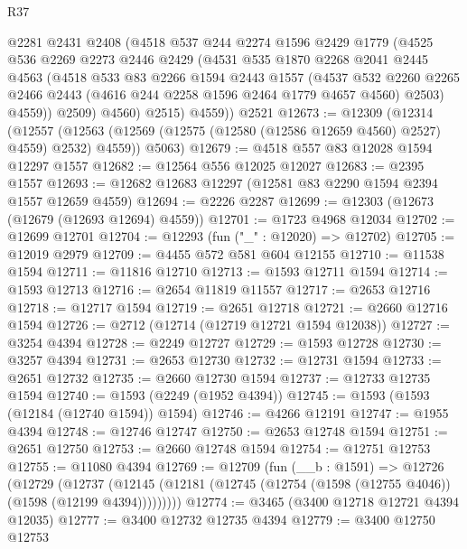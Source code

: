 \begin{lexlean}{R37}
\begin{coremodule}
          @2281
          @2431
          @2408
          (@4518
            @537
            @244
            @2274
            @1596
            @2429
            @1779
            (@4525
              @536
              @2269
              @2273
              @2446
              @2429
              (@4531
                @535
                @1870
                @2268
                @2041
                @2445
                @4563
                (@4518
                  @533
                  @83
                  @2266
                  @1594
                  @2443
                  @1557
                  (@4537
                    @532
                    @2260
                    @2265
                    @2466
                    @2443
                    (@4616 @244 @2258 @1596 @2464 @1779 @4657 @4560)
                    @2503)
                  @4559))
              @2509)
            @4560)
          @2515)
        @4559))
    @2521
@12673 := @12309
    (@12314
      (@12557 (@12563 (@12569 (@12575 (@12580 (@12586 @12659 @4560) @2527) @4559) @2532) @4559))
      @5063)
@12679 := @4518 @557 @83 @12028 @1594 @12297 @1557
@12682 := @12564 @556 @12025 @12027
@12683 := @2395 @1557
@12693 := @12682 @12683 @12297 (@12581 @83 @2290 @1594 @2394 @1557 @12659 @4559)
@12694 := @2226 @2287
@12699 := @12303 (@12673 (@12679 (@12693 @12694) @4559))
@12701 := @1723 @4968 @12034
@12702 := @12699 @12701
@12704 := @12293 (fun ("_" : @12020) => @12702)
@12705 := @12019 @2979
@12709 := @4455 @572 @581 @604 @12155
@12710 := @11538 @1594
@12711 := @11816 @12710
@12713 := @1593 @12711 @1594
@12714 := @1593 @12713
@12716 := @2654 @11819 @11557
@12717 := @2653 @12716
@12718 := @12717 @1594
@12719 := @2651 @12718
@12721 := @2660 @12716 @1594
@12726 := @2712 (@12714 (@12719 @12721 @1594 @12038))
@12727 := @3254 @4394
@12728 := @2249 @12727
@12729 := @1593 @12728
@12730 := @3257 @4394
@12731 := @2653 @12730
@12732 := @12731 @1594
@12733 := @2651 @12732
@12735 := @2660 @12730 @1594
@12737 := @12733 @12735 @1594
@12740 := @1593 (@2249 (@1952 @4394))
@12745 := @1593 (@1593 (@12184 (@12740 @1594)) @1594)
@12746 := @4266 @12191
@12747 := @1955 @4394
@12748 := @12746 @12747
@12750 := @2653 @12748 @1594
@12751 := @2651 @12750
@12753 := @2660 @12748 @1594
@12754 := @12751 @12753
@12755 := @11080 @4394
@12769 := @12709
    (fun (__b : @1591) =>
    @12726
      (@12729
        (@12737 (@12145 (@12181 (@12745 (@12754 (@1598 (@12755 @4046)) (@1598 (@12199 @4394)))))))))
@12774 := @3465 (@3400 @12718 @12721 @4394 @12035)
@12777 := @3400 @12732 @12735 @4394
@12779 := @3400 @12750 @12753

\end{coremodule}
\end{lexlean}
